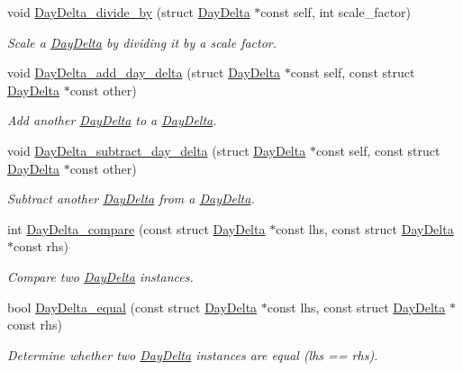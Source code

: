 \begin{DoxyCompactItemize}
void \hyperlink{day-delta_8h_a03f5153b765a355870053d9cf1ce5c78}{\-Day\-Delta\-\_\-divide\-\_\-by} (struct \hyperlink{structDayDelta}{\-Day\-Delta} $\ast$const self, int scale\-\_\-factor)
\begin{DoxyCompactList}\small\item\em \-Scale a \hyperlink{structDayDelta}{\-Day\-Delta} by dividing it by a scale factor. \end{DoxyCompactList}\item 
void \hyperlink{day-delta_8h_aeb9c43b6e4ea6121ede2cdba92131176}{\-Day\-Delta\-\_\-add\-\_\-day\-\_\-delta} (struct \hyperlink{structDayDelta}{\-Day\-Delta} $\ast$const self, const struct \hyperlink{structDayDelta}{\-Day\-Delta} $\ast$const other)
\begin{DoxyCompactList}\small\item\em \-Add another \hyperlink{structDayDelta}{\-Day\-Delta} to a \hyperlink{structDayDelta}{\-Day\-Delta}. \end{DoxyCompactList}\item 
void \hyperlink{day-delta_8h_aac914e0e1099253836fdeeae0015a2a7}{\-Day\-Delta\-\_\-subtract\-\_\-day\-\_\-delta} (struct \hyperlink{structDayDelta}{\-Day\-Delta} $\ast$const self, const struct \hyperlink{structDayDelta}{\-Day\-Delta} $\ast$const other)
\begin{DoxyCompactList}\small\item\em \-Subtract another \hyperlink{structDayDelta}{\-Day\-Delta} from a \hyperlink{structDayDelta}{\-Day\-Delta}. \end{DoxyCompactList}\item 
int \hyperlink{day-delta_8h_a9c2839c462e80f6419bb9e55f1744eab}{\-Day\-Delta\-\_\-compare} (const struct \hyperlink{structDayDelta}{\-Day\-Delta} $\ast$const lhs, const struct \hyperlink{structDayDelta}{\-Day\-Delta} $\ast$const rhs)
\begin{DoxyCompactList}\small\item\em \-Compare two \hyperlink{structDayDelta}{\-Day\-Delta} instances. \end{DoxyCompactList}\item 
bool \hyperlink{day-delta_8h_ae7f682f7bae1fc78c34690449cb84144}{\-Day\-Delta\-\_\-equal} (const struct \hyperlink{structDayDelta}{\-Day\-Delta} $\ast$const lhs, const struct \hyperlink{structDayDelta}{\-Day\-Delta} $\ast$const rhs)
\begin{DoxyCompactList}\small\item\em \-Determine whether two \hyperlink{structDayDelta}{\-Day\-Delta} instances are equal (lhs == rhs). \end{DoxyCompactList}\item 

\end{DoxyCompactItemize}
